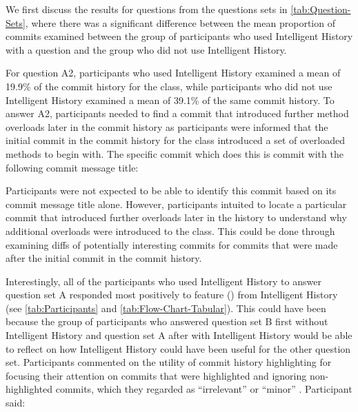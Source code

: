 We first discuss the results for questions from the questions sets in \autoref{tab:Question-Sets},
where there was a significant difference between
the mean proportion of commits examined between the group of participants who used Intelligent History with a question 
and the group who did not use Intelligent History.

For question A2, participants who used Intelligent History examined a mean of 19.9\% of the commit history for the  class,
while participants who did not use Intelligent History examined a mean of 39.1\% of the same commit history. 
To answer A2, participants needed to find a commit that introduced further  method overloads later in the commit history as participants were informed that the initial commit in the commit history for the  class introduced a set of overloaded  methods to begin with.
The specific commit which does this is commit  with the following commit message title:

\begin{center}
\end{center}

Participants were not expected to be able to identify this commit based on its commit message title alone.
However, participants intuited to locate a particular commit that introduced further overloads later in the history 
to understand why additional overloads were introduced to the  class.
This could be done through examining diffs of potentially interesting commits for commits 
that were made after the initial commit in the  commit history.

Interestingly, all of the participants who used Intelligent History to answer question set A 
responded most positively to feature () from Intelligent History  
(see \autoref{tab:Participants} and \autoref{tab:Flow-Chart-Tabular}).
This could have been because the group of participants who answered question set B first without Intelligent History 
and question set A after with Intelligent History would be able to reflect on how Intelligent History could have been useful for the other question set.
Participants commented on the utility of commit history highlighting for focusing their attention on commits that were highlighted 
and ignoring non-highlighted commits, which they regarded as ``irrelevant'' or ``minor'' .
Participant  said:

